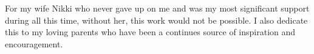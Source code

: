 
\begin{dedication} 

For my wife Nikki who never gave up on me and was my most significant support during all this time, without her, this work would not be possible. I also dedicate this to my loving parents who have been a continues source of inspiration and encouragement.

\end{dedication}

